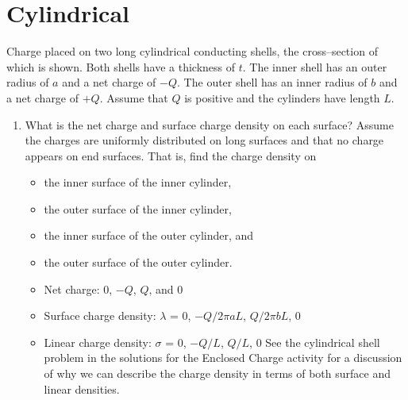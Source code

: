 \documentclass{article}
\begin{document}
\section{Cylindrical}

Charge placed on two long cylindrical conducting shells, the cross--section of which is shown. Both shells have a thickness of $t$. The inner shell has an outer radius of $a$ and a net charge of $-Q$. The outer shell has an inner radius of $b$ and a net charge of $+Q$. Assume that $Q$ is positive and the cylinders have length $L$.



\begin{enumerate}

  \item What is the net charge and surface charge density on each surface? Assume the charges are uniformly distributed on long surfaces and that no charge appears on end surfaces. That is, find the charge density on

    \begin{itemize}

      \item the inner surface of the inner cylinder,

      \item the outer surface of the inner cylinder,

      \item the inner surface of the outer cylinder, and

      \item the outer surface of the outer cylinder.

    \end{itemize}

      \begin{itemize}

        \item Net charge: $0$, $-Q$, $Q$, and $0$

        \item Surface charge density: $\lambda$ = $0$, $-Q/2\pi a L$, $Q/2\pi b L$, $0$

        \item Linear charge density: $\sigma$ = $0$, $-Q/L$, $Q/L$, $0$
              See the cylindrical shell problem in the solutions for the Enclosed Charge activity for a discussion of why we can describe the charge density in terms of both surface and linear densities.

      \end{itemize}

\end{enumerate}
\end{document}
